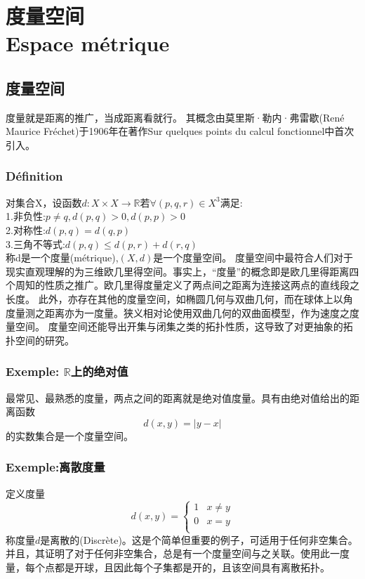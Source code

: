 \documentclass[12pt, a4paper, oneside]{ctexbook}
\begin{document}
\chapter{度量空间\\Espace métrique}
\section{度量空间}
  度量就是距离的推广，当成距离看就行。
  其概念由莫里斯·勒内·弗雷歇(René Maurice Fréchet)于1906年在著作Sur quelques points du calcul fonctionnel中首次引入。
  \subsection{Définition}
  对集合X，设函数$d:X\times X\rightarrow \mathbb{R}$若$\forall(p,q,r)\in X^3$满足:\\
  1.非负性:$p\neq q,d(p,q)>0,d(p,p)>0$\\
  2.对称性:$d(p,q)=d(q,p)$\\
  3.三角不等式:$d(p,q)\leq d(p,r)+d(r,q)$\\
  称d是一个度量(métrique),$(X,d)$是一个度量空间。
  度量空间中最符合人们对于现实直观理解的为三维欧几里得空间。事实上，“度量”的概念即是欧几里得距离四个周知的性质之推广。欧几里得度量定义了两点间之距离为连接这两点的直线段之长度。
  此外，亦存在其他的度量空间，如椭圆几何与双曲几何，而在球体上以角度量测之距离亦为一度量。狭义相对论使用双曲几何的双曲面模型，作为速度之度量空间。
  度量空间还能导出开集与闭集之类的拓扑性质，这导致了对更抽象的拓扑空间的研究。
                 
  \subsection{Exemple: $\mathbb{R}$上的绝对值}
  最常见、最熟悉的度量，两点之间的距离就是绝对值度量。具有由绝对值给出的距离函数
  $$
  d(x,y) = \vert y - x \vert
  $$
  的实数集合是一个度量空间。

  \subsection{Exemple:离散度量}     \label{myref:lisanduliang}
  定义度量
  $$
  d(x,y)=
  \begin{cases}
    1 & x\neq y\\
    0 & x=y\\
  \end{cases}
  $$
  称度量$d$是离散的(Discrète)。这是个简单但重要的例子，可适用于任何非空集合。
  并且，其证明了对于任何非空集合，总是有一个度量空间与之关联。使用此一度量，每个点都是开球，且因此每个子集都是开的，且该空间具有离散拓扑。
  
\end{document}
